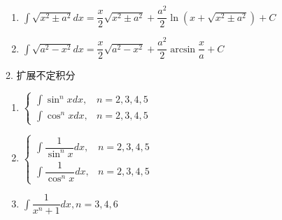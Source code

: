 \begin{theorem}[常用不定积分]
\begin{enumerate}
		\item $\int \sqrt{x^{2}\pm a^{2}}dx = \dfrac{x}{2}\sqrt{x^{2}\pm a^{2}}+\dfrac{a^{2}}{2}\ln (x + \sqrt{x^{2}\pm a^{2}}) + C$
		\item $\int \sqrt{a^{2}-x^{2}}dx = \dfrac{x}{2}\sqrt{a^{2}-x^{2}}+\dfrac{a^{2}}{2}\arcsin \dfrac{x}{a} + C$
	\end{enumerate}
	2. 扩展不定积分
	\begin{enumerate}
		\item $\begin{cases} \int \sin^{n} xdx, & n = 2,3,4,5   \\ \int \cos^{n} xdx, & n = 2,3,4,5 \end{cases}$
		\item $\begin{cases} \int \dfrac{1}{\sin^{n} x}dx, & n = 2,3,4,5   \\ \int \dfrac{1}{\cos^{n} x}dx, & n = 2,3,4,5 \end{cases}$
		\item $\int \dfrac{1}{x^{n}+1} dx , n = 3,4,6$
	\end{enumerate}
\end{theorem}
